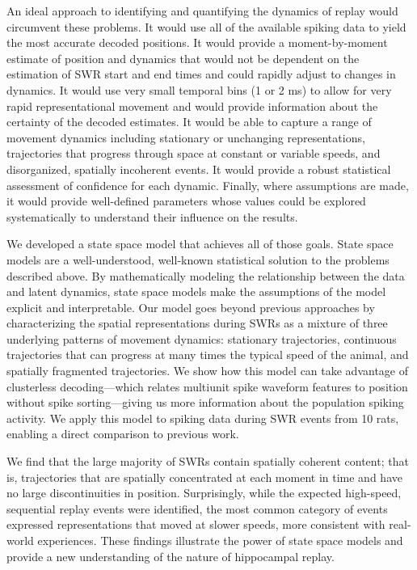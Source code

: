 \documentclass[9pt,lineno]{elife}
\begin{document}
An ideal approach to identifying and quantifying the dynamics of replay would circumvent these problems. It would use all of the available spiking data to yield the most accurate decoded positions. It would provide a moment-by-moment estimate of position and dynamics that would not be dependent on the estimation of SWR start and end times and could rapidly adjust to changes in dynamics. It would use very small temporal bins (1 or 2 ms) to allow for very rapid representational movement and would provide information about the certainty of the decoded estimates. It would be able to capture a range of movement dynamics including stationary or unchanging representations, trajectories that progress through space at constant or variable speeds, and disorganized, spatially incoherent events. It would provide a robust statistical assessment of confidence for each dynamic. Finally, where assumptions are made, it would provide well-defined parameters whose values could be explored systematically to understand their influence on the results.

We developed a state space model that achieves all of those goals. State space models are a well-understood, well-known statistical solution to the problems described above. By mathematically modeling the relationship between the data and latent dynamics, state space models make the assumptions of the model explicit and interpretable. Our model goes beyond previous approaches \citep{DengRapidclassificationhippocampal2016, MaboudiUncoveringtemporalstructure2018} by characterizing the spatial representations during SWRs as a mixture of three underlying patterns of movement dynamics: stationary trajectories, continuous trajectories that can progress at many times the typical speed of the animal, and spatially fragmented trajectories. We show how this model can take advantage of clusterless decoding---which relates multiunit spike waveform features to position without spike sorting---giving us more information about the population spiking activity. We apply this model to spiking data during SWR events from 10 rats, enabling a direct comparison to previous work.

We find that the large majority of SWRs contain spatially coherent content; that is, trajectories that are spatially concentrated at each moment in time and have no large discontinuities in position. Surprisingly, while the expected high-speed, sequential replay events were identified, the most common category of events expressed representations that moved at slower speeds, more consistent with real-world experiences. These findings illustrate the power of state space models and provide a new understanding of the nature of hippocampal replay.
\end{document}
